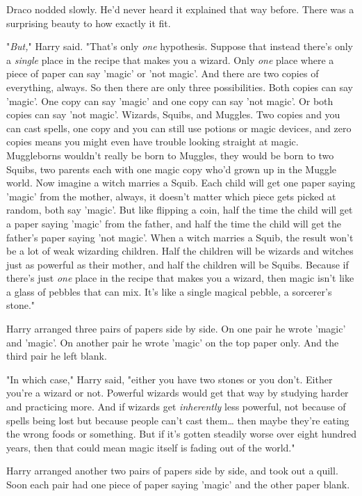 Draco nodded slowly. He'd never heard it explained that way before. There was a 
surprising beauty to how exactly it fit.

"\emph{But,}" Harry said. "That's only \emph{one} hypothesis. Suppose that 
instead there's only a \emph{single} place in the recipe that makes you a 
wizard. Only \emph{one} place where a piece of paper can say 'magic' or 'not 
magic'. And there are two copies of everything, always. So then there are only 
three possibilities. Both copies can say 'magic'. One copy can say 'magic' and 
one copy can say 'not magic'. Or both copies can say 'not magic'. Wizards, 
Squibs, and Muggles. Two copies and you can cast spells, one copy and you can 
still use potions or magic devices, and zero copies means you might even have 
trouble looking straight at magic. Muggleborns wouldn't really be born to 
Muggles, they would be born to two Squibs, two parents each with one magic copy 
who'd grown up in the Muggle world. Now imagine a witch marries a Squib. Each 
child will get one paper saying 'magic' from the mother, always, it doesn't 
matter which piece gets picked at random, both say 'magic'. But like flipping a 
coin, half the time the child will get a paper saying 'magic' from the father, 
and half the time the child will get the father's paper saying 'not magic'. 
When a witch marries a Squib, the result won't be a lot of weak wizarding 
children. Half the children will be wizards and witches just as powerful as 
their mother, and half the children will be Squibs. Because if there's just 
\emph{one} place in the recipe that makes you a wizard, then magic isn't like a 
glass of pebbles that can mix. It's like a single magical pebble, a sorcerer's 
stone."

Harry arranged three pairs of papers side by side. On one pair he wrote 'magic' 
and 'magic'. On another pair he wrote 'magic' on the top paper only. And the 
third pair he left blank.

"In which case," Harry said, "either you have two stones or you don't. Either 
you're a wizard or not. Powerful wizards would get that way by studying harder 
and practicing more. And if wizards get \emph{inherently} less powerful, not 
because of spells being lost but because people can't cast them{\ldots} then 
maybe they're eating the wrong foods or something. But if it's gotten steadily 
worse over eight hundred years, then that could mean magic itself is fading out 
of the world."

Harry arranged another two pairs of papers side by side, and took out a quill. 
Soon each pair had one piece of paper saying 'magic' and the other paper blank.

